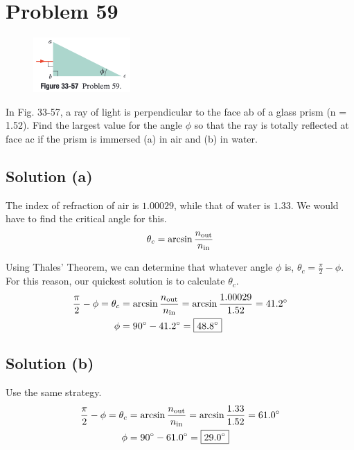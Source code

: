 \documentclass[12pt]{article}
\begin{document}
    \pagebreak
    \section{Problem 59}
        \begin{figure}
            \vspace{-30pt}
            \includegraphics[width=0.33\textwidth]{33-57.png} 
        \end{figure}
        In Fig. 33-57, a ray of light is perpendicular to the face ab of a glass prism (n = 1.52).
        Find the largest value for the angle $\phi$ so that the ray is totally reflected at face ac if the prism is immersed (a) in air and (b) in water.

        \subsection{Solution (a)}
            The index of refraction of air is $1.00029$, while that of water is $1.33$.
            We would have to find the critical angle for this.
            \begin{equation}
                \theta_c = \arcsin \frac{n_{\rm out}}{n_{\rm in}}
            \end{equation}

            Using Thales' Theorem, we can determine that whatever angle $\phi$ is, $\theta_c = \frac{\pi}{2} - \phi$.
            For this reason, our quickest solution is to calculate $\theta_c$.
            \begin{align}
                \frac{\pi}{2} - \phi    =   \theta_c    
                    &=  \arcsin \frac{n_{\rm out}}{n_{\rm in}}
                    =   \arcsin \frac{1.00029}{1.52}
                    =   41.2\unit{\degree}\\
                \phi    &=  90\unit{\degree} - 41.2\unit{\degree}
                    =   \boxed{48.8\unit{\degree}}
            \end{align}

        \subsection{Solution (b)}
            Use the same strategy.
            \begin{align}
                \frac{\pi}{2} - \phi    =   \theta_c    
                    &=  \arcsin \frac{n_{\rm out}}{n_{\rm in}}
                    =   \arcsin \frac{1.33}{1.52}
                    =   61.0\unit{\degree}\\
                \phi    &=  90\unit{\degree} - 61.0\unit{\degree}
                    =   \boxed{29.0\unit{\degree}}
            \end{align}
\end{document}
